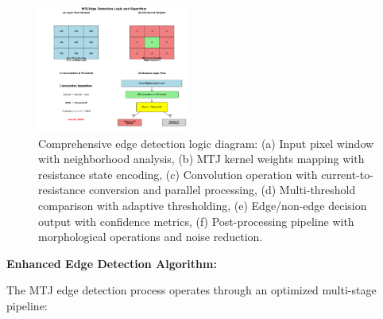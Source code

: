 \documentclass[conference]{IEEEtran}
\begin{document}
\begin{figure}[htbp]
\centerline{\includegraphics[width=0.45\textwidth]{edge_detection_logic.png}}
\caption{Comprehensive edge detection logic diagram: (a) Input pixel window with neighborhood analysis, (b) MTJ kernel weights mapping with resistance state encoding, (c) Convolution operation with current-to-resistance conversion and parallel processing, (d) Multi-threshold comparison with adaptive thresholding, (e) Edge/non-edge decision output with confidence metrics, (f) Post-processing pipeline with morphological operations and noise reduction.}
\label{fig:edge_logic}
\end{figure}

\textbf{Enhanced Edge Detection Algorithm:}

The MTJ edge detection process operates through an optimized multi-stage pipeline:
\end{document}
